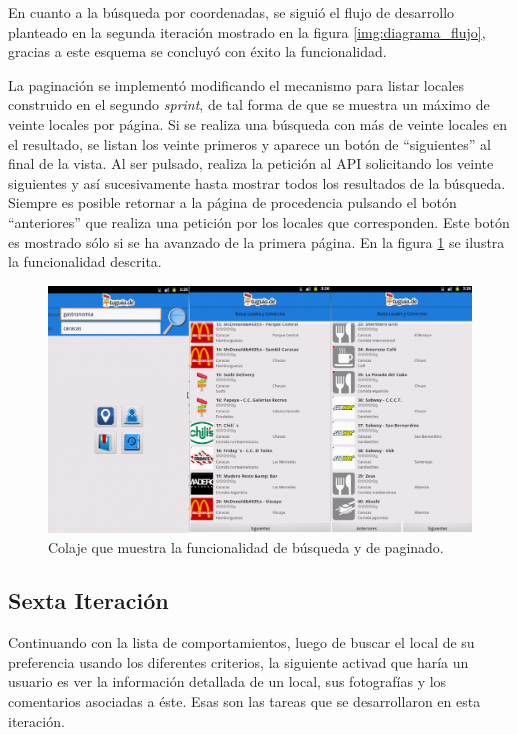 En cuanto a la búsqueda por coordenadas, se siguió el flujo de desarrollo planteado en la segunda iteración mostrado en la figura \ref{img:diagrama_flujo}, gracias a este esquema se concluyó con éxito la funcionalidad.

La paginación se implementó modificando el mecanismo para listar locales construido en el segundo \textit{sprint}, de tal forma de que se muestra un máximo de veinte locales por página. Si se realiza una búsqueda con más de veinte locales en el resultado, se listan los veinte primeros y aparece un botón de ``siguientes'' al final de la vista. Al ser pulsado, realiza la petición al API solicitando los veinte siguientes y así sucesivamente hasta mostrar todos los resultados de la búsqueda. Siempre es posible retornar a la página de procedencia pulsando el botón ``anteriores'' que realiza una petición por los locales que corresponden. Este botón es mostrado sólo si se ha avanzado de la primera página. En la figura \ref{img:doblesearch} se ilustra la funcionalidad descrita.
 
\begin{figure}[h]
	\begin{center}
		\includegraphics[scale=0.39]{imagenes/search_doble.png}
	\end{center}
	\caption{
		\label{img:doblesearch}
		Colaje que muestra la funcionalidad de búsqueda y de paginado. 
	}
\end{figure}

\subsection{Sexta Iteración}
Continuando con la lista de comportamientos, luego de buscar el local de su preferencia usando los diferentes criterios, la siguiente activad que haría un usuario es ver la información detallada de un local, sus fotografías y los comentarios asociadas a éste. Esas son las tareas que se desarrollaron en esta iteración. 
